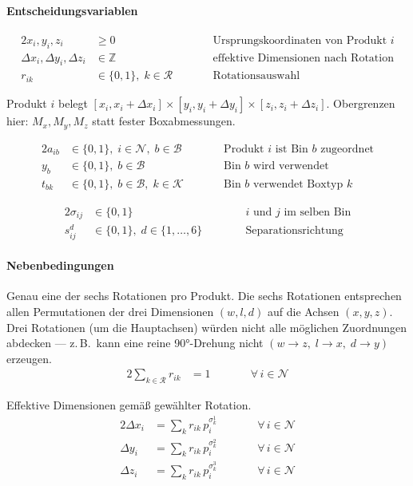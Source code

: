 \documentclass[10pt]{article}
\newcommand{\NN}{\mathcal{N}}
\newcommand{\R}{\mathcal{R}}
\newcommand{\BB}{\mathcal{B}}
\newcommand{\KK}{\mathcal{K}}
\begin{document}
\paragraph{Entscheidungsvariablen}
\label{sec:s2:vars}

\begin{alignat*}{2}
x_i, y_i, z_i &\geq 0
  &\qquad& \text{Ursprungskoordinaten von Produkt $i$} \\
\Delta x_i, \Delta y_i, \Delta z_i &\in \mathbb{Z}
  && \text{effektive Dimensionen nach Rotation} \\
r_{ik} &\in \{0,1\},\; k \in \R
  && \text{Rotationsauswahl}
\end{alignat*}

Produkt $i$ belegt $[x_i, x_i{+}\Delta x_i] \times [y_i, y_i{+}\Delta y_i] \times [z_i, z_i{+}\Delta z_i]$.
Obergrenzen hier: $M_x, M_y, M_z$ statt fester Boxabmessungen.

\begin{alignat*}{2}
a_{ib} &\in \{0,1\},\; i \in \NN,\; b \in \BB
  &\qquad& \text{Produkt $i$ ist Bin $b$ zugeordnet} \\
y_b &\in \{0,1\},\; b \in \BB
  && \text{Bin $b$ wird verwendet} \\
t_{bk} &\in \{0,1\},\; b \in \BB,\; k \in \KK
  && \text{Bin $b$ verwendet Boxtyp $k$}
\end{alignat*}

\begin{alignat*}{2}
\sigma_{ij} &\in \{0,1\}\;
  &\qquad& \text{$i$ und $j$ im selben Bin} \\
s_{ij}^d &\in \{0,1\},\; d \in \{1,\dots,6\}\;
  && \text{Separationsrichtung}
\end{alignat*}

\paragraph{Nebenbedingungen}

\label{sec:s2:rotation}
Genau eine der sechs Rotationen pro Produkt.
Die sechs Rotationen entsprechen allen Permutationen der drei Dimensionen
$(w, l, d)$ auf die Achsen $(x, y, z)$.
Drei Rotationen (um die Hauptachsen) w\"urden nicht alle m\"oglichen
Zuordnungen abdecken --- z.\,B.\ kann eine reine 90°-Drehung nicht
$(w \to z,\; l \to x,\; d \to y)$ erzeugen.
\begin{alignat*}{2}
\sum_{k \in \R} r_{ik} &= 1
  &\qquad& \forall\, i \in \NN
\end{alignat*}

Effektive Dimensionen gem\"a\ss{} gew\"ahlter Rotation.
\begin{alignat*}{2}
\Delta x_i &= \textstyle\sum_k r_{ik}\, p_i^{\sigma_k^1}
  &\qquad& \forall\, i \in \NN \\
\Delta y_i &= \textstyle\sum_k r_{ik}\, p_i^{\sigma_k^2}
  && \forall\, i \in \NN \\
\Delta z_i &= \textstyle\sum_k r_{ik}\, p_i^{\sigma_k^3}
  && \forall\, i \in \NN
\end{alignat*}
\end{document}
